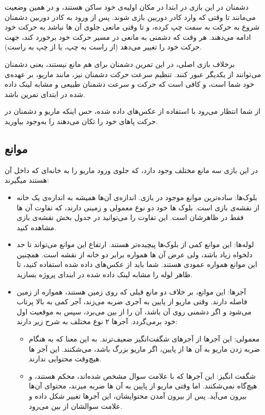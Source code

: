 \documentclass{utap}
\begin{document}
دشمنان در این بازی در ابتدا در مکان اولیه‌ی خود ساکن هستند، و در همین وضعیت می‌مانند تا وقتی که وارد کادر دوربین بازی شوند. پس از ورود به کادر دوربین دشمنان شروع به حرکت به سمت چپ کرده، و تا وقتی مانعی جلو‌ی آن ها نباشد به حرکت خود ادامه می‌دهند. هر وقت که دشمنی به مانعی در مسیر حرکت خود برخورد کند، جهت حرکت خود را تغییر می‌دهد (از راست به چپ، یا از چپ به راست).

برخلاف بازی اصلی، در این تمرین دشمنان برای هم مانع نیستند، یعنی دشمنان می‌توانند از یکدیگر عبور کنند. تنظیم سرعت حرکت دشمنان نیز، مانند ماریو، بر عهده‌ی خود شما است، و کافی است که حرکت و سرعت دشمنان طبیعی و مشابه لینک داده شده در ابتدای تمرین باشد.

از شما انتظار می‌رود با استفاده از عکس‌های داده شده، حس اینکه ماریو و دشمنان در حرکت پاهای خود را تکان می‌دهند را به‌وجود بیاورید.

	\subsection{موانع}
در این بازی سه مانع مختلف وجود دارد، که جلوی ورود ماریو را به خانه‌ای که داخل آن هستند میگیرند:
	\begin{itemize}
		\item
بلوک‌ها: ساده‌ترین موانع موجود در بازی. اندازه‌ی آن‌ها همیشه به اندازه‌ی یک خانه‌ از نقشه‌ی بازی است. بلوک ها خود دو نوع معمولی و زمینی دارند، که تفاوت آن ها فقط در ظاهرشان است. این تفاوت را می‌توانید در جدول بخش نقشه‌ی بازی مشاهده کنید.
		\item
لوله‌ها: این موانع کمی از بلوک‌ها پیچیده‌تر هستند. ارتفاع این موانع می‌تواند تا حد دلخواه زیاد باشد، ولی عرض آن ها همواره برابر دو خانه‌ از نقشه است. همچنین این موانع همواره عمودی هستند. شما باید از عکس‌های داده شده استفاده کنید، تا ظاهر لوله را مشابه لینک داده شده در ابندای پروژه بسازید.
		\item
آجرها: این موانع، بر خلاف دو مانع قبلی که روی زمین هستند، همواره از زمین فاصله دارند. وقتی ماریو از پایین به آجری ضربه می‌زند، آجر کمی به بالا پرتاب می‌شود و اگر دشمنی روی آن‌ باشد، آن را از بین می‌برد، سپس به موقعیت اول خود برمی‌گردد. آجرها ۲ نوع مختلف به شرح زیر دارند:
		\begin{itemize}
			\item
معمولی:‌ این آجرها از آجر‌های شگفت‌انگیز ضعیف‌ترند. به این معنا که به هنگام ضربه زدن ماریو به آن ها از پایین، اگر ماریو بزرگ باشد، می‌شکنند. این آجر ها هیچ‌وقت محتوایی ندارند.
			\item
شگفت انگیز: این آجرها که با علامت سوال مشخص شده‌اند، محکم هستند، و هیچ‌گاه نمی‌شکنند. اما وقتی ماریو از پایین به آن ها ضربه میزند، محتوای آن‌ها بیرون می‌آید. پس از بیرون آمدن محتوایشان،‌ این آجر‌ها تغییر شکل داده و علامت سوالشان از بین می‌رود.
		\end{itemize}
	\end{itemize}
\end{document}

